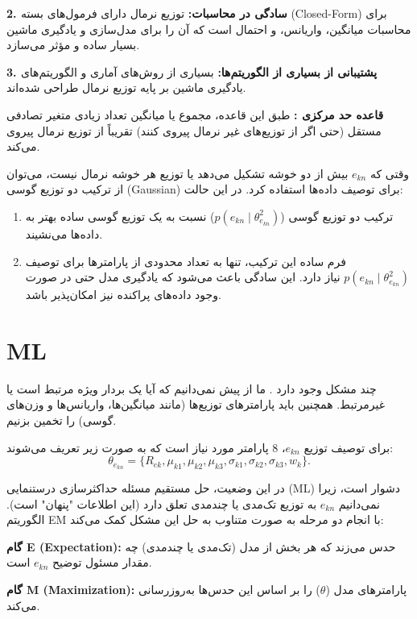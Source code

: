 \documentclass[a4paper,12pt,openany]{report}
\begin{document}
\textbf{2. سادگی در محاسبات:}  
توزیع نرمال دارای فرمول‌های بسته (Closed-Form) برای محاسبات میانگین، واریانس، و احتمال است که آن را برای مدل‌سازی و یادگیری ماشین بسیار ساده و مؤثر می‌سازد.

\textbf{3. پشتیبانی از بسیاری از الگوریتم‌ها:}  
بسیاری از روش‌های آماری و الگوریتم‌های یادگیری ماشین  بر پایه توزیع نرمال طراحی شده‌اند.

\vspace{0.5cm}

\textbf{قاعده حد مرکزی :}  
طبق این قاعده، مجموع یا میانگین تعداد زیادی متغیر تصادفی مستقل (حتی اگر از توزیع‌های غیر نرمال پیروی کنند) تقریباً از توزیع نرمال پیروی می‌کند. 


وقتی که \( e_{kn} \) بیش از دو خوشه تشکیل می‌دهد یا توزیع هر خوشه نرمال نیست، می‌توان از ترکیب دو توزیع گوسی (Gaussian) برای توصیف داده‌ها استفاده کرد. در این حالت:
\begin{enumerate}
	\item ترکیب دو توزیع گوسی (\( p(e_{kn} \mid \theta_{e_{kn}}^2) \)) نسبت به یک توزیع گوسی ساده بهتر به داده‌ها می‌نشیند.
	\item فرم ساده این ترکیب، تنها به تعداد محدودی از پارامترها برای توصیف \( p(e_{kn} \mid \theta_{e_{kn}}^2) \) نیاز دارد. این سادگی باعث می‌شود که یادگیری مدل حتی در صورت وجود داده‌های پراکنده نیز امکان‌پذیر باشد.
\end{enumerate}
\section{ML}

چند مشکل وجود دارد . ما از پیش نمی‌دانیم که آیا یک بردار ویژه مرتبط است یا غیرمرتبط.  
همچنین باید پارامترهای توزیع‌ها (مانند میانگین‌ها، واریانس‌ها و وزن‌های گوسی) را تخمین بزنیم.

برای توصیف توزیع \( e_{kn} \)، 8 پارامتر مورد نیاز است که به صورت زیر تعریف می‌شوند:
\[
\theta_{e_{kn}} = \{ R_{ek}, \mu_{k1}, \mu_{k2}, \mu_{k3}, \sigma_{k1}, \sigma_{k2}, \sigma_{k3}, w_k \}.
\]

در این وضعیت، حل مستقیم مسئله حداکثرسازی درستنمایی (ML) دشوار است، زیرا نمی‌دانیم \( e_{kn} \) به توزیع تک‌مدی یا چندمدی تعلق دارد (این اطلاعات "پنهان" است).  
الگوریتم EM با انجام دو مرحله به صورت متناوب به حل این مشکل کمک می‌کند:

\begin{itemize*}
	\item \textbf{گام E (Expectation):} حدس می‌زند که هر بخش از مدل (تک‌مدی یا چندمدی) چه مقدار مسئول توضیح \( e_{kn} \) است.
	\item \textbf{گام M (Maximization):} پارامترهای مدل (\( \theta \)) را بر اساس این حدس‌ها به‌روزرسانی می‌کند.
\end{itemize*}
\end{document}
